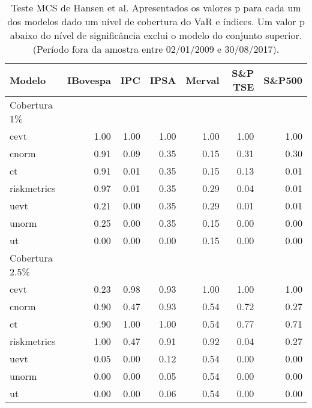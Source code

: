 \begin{table}[H]
\centering
\caption{Teste MCS de Hansen et al. Apresentados os valores p para cada um dos modelos
             dado um nível de cobertura do VaR e índices. Um valor p abaixo do nível de significância
             exclui o modelo do conjunto superior. (Período fora da amostra entre 02/01/2009 e 30/08/2017).} 
\label{tab:mcs}
\begin{tabular}{lrrrrrr}
  \hline
Modelo & IBovespa & IPC & IPSA & Merval & S\&P TSE & S\&P500 \\ 
  \hline
Cobertura 1\% &  &  &  &  &  &  \\ 
  cevt & 1.00 & 1.00 & 1.00 & 1.00 & 1.00 & 1.00 \\ 
  cnorm & 0.91 & 0.09 & 0.35 & 0.15 & 0.31 & 0.30 \\ 
  ct & 0.91 & 0.01 & 0.35 & 0.15 & 0.13 & 0.01 \\ 
  riskmetrics & 0.97 & 0.01 & 0.35 & 0.29 & 0.04 & 0.01 \\ 
  uevt & 0.21 & 0.00 & 0.35 & 0.29 & 0.01 & 0.01 \\ 
  unorm & 0.25 & 0.00 & 0.35 & 0.15 & 0.00 & 0.00 \\ 
  ut & 0.00 & 0.00 & 0.00 & 0.15 & 0.00 & 0.00 \\ 
  Cobertura 2.5\% &  &  &  &  &  &  \\ 
  cevt & 0.23 & 0.98 & 0.93 & 1.00 & 1.00 & 1.00 \\ 
  cnorm & 0.90 & 0.47 & 0.93 & 0.54 & 0.72 & 0.27 \\ 
  ct & 0.90 & 1.00 & 1.00 & 0.54 & 0.77 & 0.71 \\ 
  riskmetrics & 1.00 & 0.47 & 0.91 & 0.92 & 0.04 & 0.27 \\ 
  uevt & 0.05 & 0.00 & 0.12 & 0.54 & 0.00 & 0.00 \\ 
  unorm & 0.00 & 0.00 & 0.05 & 0.54 & 0.00 & 0.00 \\ 
  ut & 0.00 & 0.00 & 0.06 & 0.54 & 0.00 & 0.00 \\ 
   \hline
\end{tabular}
\end{table}
